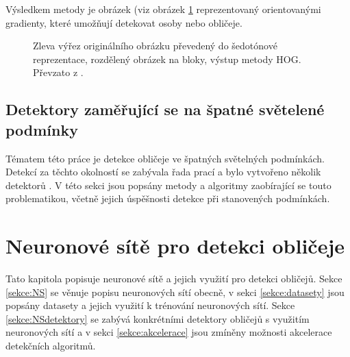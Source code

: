 Výsledkem metody je obrázek (viz obrázek \ref{hogexample} reprezentovaný orientovanými gradienty, které umožňují detekovat osoby nebo obličeje.

\begin{figure}[H]
  \begin{center}
  \label{hogexample}
  \caption{Zleva výřez originálního obrázku převedený do šedotónové reprezentace, rozdělený obrázek na bloky, výstup metody HOG. Převzato z \cite{hog2}.}
  \end{center}
\end{figure}


\section{Detektory zaměřující se na špatné světelené podmínky}
Tématem této práce je detekce obličeje ve špatných světelných podmínkách. Detekcí za těchto okolností se zabývala řada prací a bylo vytvořeno několik detektorů \cite{}. V této sekci jsou popsány metody a algoritmy zaobírající se touto problematikou, včetně jejich úspěšnosti detekce při stanovených podmínkách.



\chapter{Neuronové sítě pro detekci obličeje}
Tato kapitola popisuje neuronové sítě a jejich využití pro detekci obličejů. Sekce \ref{sekce:NS} se věnuje popisu neuronových sítí obecně, v sekci \ref{sekce:datasety} jsou popsány datasety a jejich využití k trénování neuronových sítí. Sekce \ref{sekce:NSdetektory} se zabývá konkrétními detektory obličejů s využitím neuronových sítí a v sekci \ref{sekce:akcelerace} jsou zmíněny možnosti akcelerace detekčních algoritmů.


